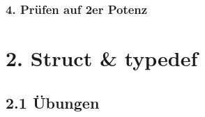 \documentclass[a4paper,10pt,english]{report}
\begin{document}
\subsubsection{4. Prüfen auf 2\sphinxhyphen{}er Potenz}
\label{\detokenize{P03_Bit_Operation_struct_typedef/README:prufen-auf-2-er-potenz}}
\begin{sphinxVerbatim}[commandchars=\\\{\}]
 
 

 
   
            
     
   
\end{sphinxVerbatim}


\section{2. Struct \& typedef}
\label{\detokenize{P03_Bit_Operation_struct_typedef/README:struct-typedef}}

\subsection{2.1 Übungen}
\label{\detokenize{P03_Bit_Operation_struct_typedef/README:id1}}
\end{document}

